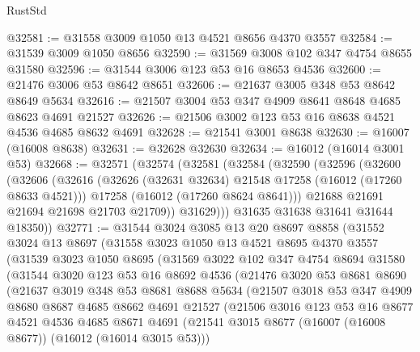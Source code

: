 \begin{lexlean}{RustStd}
\begin{coremodule}
@32581 := @31558 @3009 @1050 @13 @4521 @8656 @4370 @3557
@32584 := @31539 @3009 @1050 @8656
@32590 := @31569 @3008 @102 @347 @4754 @8655 @31580
@32596 := @31544 @3006 @123 @53 @16 @8653 @4536
@32600 := @21476 @3006 @53 @8642 @8651
@32606 := @21637 @3005 @348 @53 @8642 @8649 @5634
@32616 := @21507 @3004 @53 @347 @4909 @8641 @8648 @4685 @8623 @4691 @21527
@32626 := @21506 @3002 @123 @53 @16 @8638 @4521 @4536 @4685 @8632 @4691
@32628 := @21541 @3001 @8638
@32630 := @16007 (@16008 @8638)
@32631 := @32628 @32630
@32634 := @16012 (@16014 @3001 @53)
@32668 := @32571
    (@32574
      (@32581
        (@32584
          (@32590
            (@32596
              (@32600
                (@32606
                  (@32616
                    (@32626 (@32631 @32634) @21548 @17258 (@16012 (@17260 @8633 @4521)))
                    @17258
                    (@16012 (@17260 @8624 @8641)))
                  @21688
                  @21691
                  @21694
                  @21698
                  @21703
                  @21709))
              @31629)))
        @31635
        @31638
        @31641
        @31644
        @18350))
@32771 := @31544
    @3024
    @3085
    @13
    @20
    @8697
    @8858
    (@31552
      @3024
      @13
      @8697
      (@31558
        @3023
        @1050
        @13
        @4521
        @8695
        @4370
        @3557
        (@31539
          @3023
          @1050
          @8695
          (@31569
            @3022
            @102
            @347
            @4754
            @8694
            @31580
            (@31544
              @3020
              @123
              @53
              @16
              @8692
              @4536
              (@21476
                @3020
                @53
                @8681
                @8690
                (@21637
                  @3019
                  @348
                  @53
                  @8681
                  @8688
                  @5634
                  (@21507
                    @3018
                    @53
                    @347
                    @4909
                    @8680
                    @8687
                    @4685
                    @8662
                    @4691
                    @21527
                    (@21506
                      @3016
                      @123
                      @53
                      @16
                      @8677
                      @4521
                      @4536
                      @4685
                      @8671
                      @4691
                      (@21541 @3015 @8677 (@16007 (@16008 @8677)) (@16012 (@16014 @3015 @53)))

\end{coremodule}
\end{lexlean}
